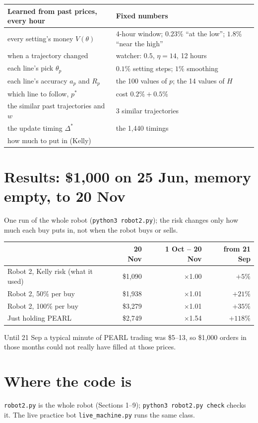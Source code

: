 \documentclass[11pt]{article}
\begin{document}
\begin{center}
\renewcommand{\arraystretch}{1.25}
\begin{tabular}{@{}l l@{}}
\toprule
Learned from past prices, every hour & Fixed numbers \\
\midrule
every setting's money $V(\theta)$ & 4-hour window; $0.23\%$ ``at the low''; $1.8\%$ ``near the high'' \\
when a trajectory changed & watcher: $0.5$, $\eta = 14$, 12 hours \\
each line's pick $\theta_p$ & $0.1\%$ setting steps; $1\%$ smoothing \\
each line's accuracy $a_p$ and $R_p$ & the 100 values of $p$; the 14 values of $H$ \\
which line to follow, $p^*$ & cost $0.2\% + 0.5\%$ \\
the similar past trajectories and $w$ & 3 similar trajectories \\
the update timing $\Delta^*$ & the 1,440 timings \\
how much to put in (Kelly) & \\
\bottomrule
\end{tabular}
\end{center}

\section{Results: \$1{,}000 on 25 Jun, memory empty, to 20 Nov}

One run of the whole robot (\texttt{python3 robot2.py}); the risk changes only how much each buy
puts in, not when the robot buys or sells.

\begin{center}
\renewcommand{\arraystretch}{1.25}
\begin{tabular}{@{}l r r r@{}}
\toprule
 & 20 Nov & 1 Oct -- 20 Nov & from 21 Sep \\
\midrule
Robot 2, Kelly risk (what it used) & \$1{,}090 & $\times$1.00 & $+5\%$ \\
Robot 2, 50\% per buy & \$1{,}938 & $\times$1.01 & $+21\%$ \\
Robot 2, 100\% per buy & \$3{,}279 & $\times$1.01 & $+35\%$ \\
\midrule
Just holding PEARL & \$2{,}749 & $\times$1.54 & $+118\%$ \\
\bottomrule
\end{tabular}
\end{center}
Until 21 Sep a typical minute of PEARL trading was \$5--13, so \$1{,}000 orders in those months could
not really have filled at those prices.

\section*{Where the code is}

\texttt{robot2.py} is the whole robot (Sections 1--9); \texttt{python3 robot2.py check} checks it.
The live practice bot \texttt{live\_machine.py} runs the same class.
\end{document}
